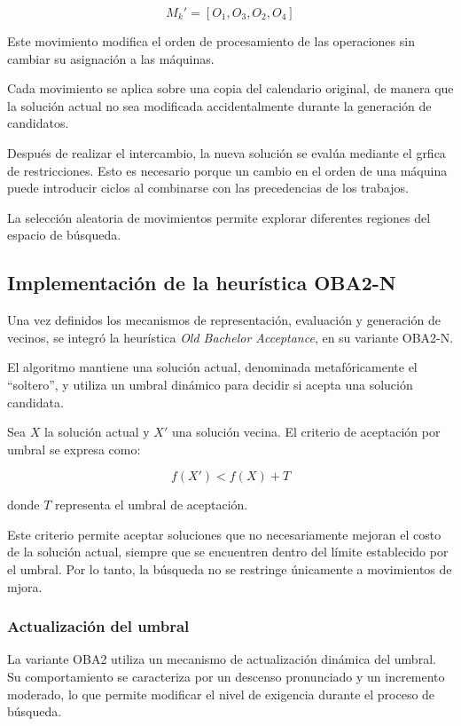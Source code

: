 \documentclass[12pt,a4paper]{article}
\begin{document}
\[
M_k' = [O_1,O_3,O_2,O_4]
\]

Este movimiento modifica el orden de procesamiento de las operaciones sin cambiar su asignación a las máquinas.

Cada movimiento se aplica sobre una copia del calendario original, de manera que la solución actual no sea modificada accidentalmente durante la generación de candidatos.

Después de realizar el intercambio, la nueva solución se evalúa mediante el grfica de restricciones. Esto es necesario porque un cambio en el orden de una máquina puede introducir ciclos al combinarse con las precedencias de los trabajos.

La selección aleatoria de movimientos permite explorar diferentes regiones del espacio de búsqueda.

\subsection{Implementación de la heurística OBA2-N}

Una vez definidos los mecanismos de representación, evaluación y generación de vecinos, se integró la heurística \textit{Old Bachelor Acceptance}, en su variante OBA2-N.

El algoritmo mantiene una solución actual, denominada metafóricamente el ``soltero'', y utiliza un umbral dinámico
para decidir si acepta una solución candidata.

Sea $X$ la solución actual y $X'$ una solución vecina.
El criterio de aceptación por umbral se expresa como:

\[
f(X') < f(X) + T
\]

donde $T$ representa el umbral de aceptación.

Este criterio permite aceptar soluciones que no necesariamente mejoran el costo de la solución actual, siempre que se encuentren dentro del límite establecido por el umbral. Por lo tanto, la búsqueda no se restringe únicamente a movimientos de mjora.

\subsubsection{Actualización del umbral}

La variante OBA2 utiliza un mecanismo de actualización dinámica del umbral. Su comportamiento se caracteriza por un descenso pronunciado y un incremento moderado, lo que permite modificar el nivel de exigencia durante el proceso
de búsqueda.
\end{document}
